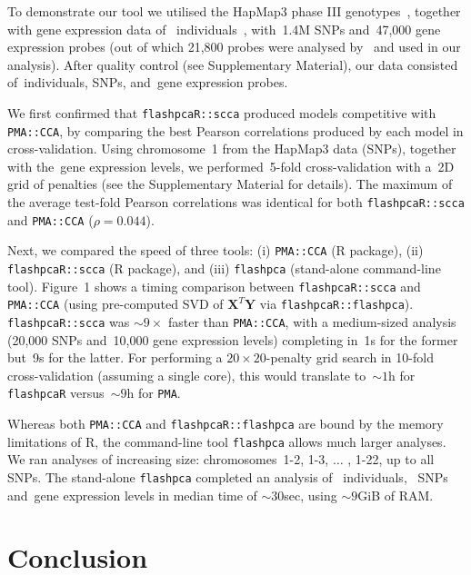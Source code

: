 \documentclass{bioinfo}
\begin{document}
To demonstrate our tool we utilised the HapMap3 phase III
genotypes~\citep{hapmap2010}, together with gene expression data of~\nindiv
individuals~\citep{Stranger2012}, with~1.4M SNPs and~47,000 gene expression
probes (out of which 21,800 probes were analysed by~\citet{Stranger2012} and
used in our analysis). After quality control (see Supplementary Material),
our data consisted of~\nindiv individuals, \nsnps SNPs, and~\ngenes gene
expression probes.

We first confirmed that \texttt{flashpcaR::scca} produced models competitive
with \texttt{PMA::CCA}, by comparing the best Pearson correlations produced
by each model in cross-validation.  Using chromosome~1 from the HapMap3
data (\nsnpschr SNPs), together with the~\ngenes gene expression levels,
we performed~5-fold cross-validation with a~2D grid of penalties (see the
Supplementary Material for details). The maximum of the average test-fold
Pearson correlations was identical for both \texttt{flashpcaR::scca} and
\texttt{PMA::CCA} ($\rho=0.044$).

Next, we compared the speed of three tools: (i) \texttt{PMA::CCA} (\textsf{R}
package), (ii) \texttt{flashpcaR::scca} (\textsf{R} package), and (iii)
\texttt{flashpca} (stand-alone command-line tool).
Figure~1\vphantom{\ref{fig:01}} shows a timing comparison between
\texttt{flashpcaR::scca} and \texttt{PMA::CCA} (using pre-computed SVD of
$\mathbf{X}^T \mathbf{Y}$ via \texttt{flashpcaR::flashpca}).
\texttt{flashpcaR::scca} was ${\sim}9\times$ faster than \texttt{PMA::CCA}, with
a medium-sized analysis (20,000 SNPs and~10,000 gene expression levels)
completing in~1s for the former but~9s for the latter.  For performing a
$20\times20$-penalty grid search in 10-fold cross-validation (assuming a single
core), this would translate to~${\sim}1$h for \texttt{flashpcaR}
versus~${\sim}9$h for \texttt{PMA}.

Whereas both \texttt{PMA::CCA} and \texttt{flashpcaR::flashpca}
are bound by the memory limitations of \textsf{R}, the command-line
tool \texttt{flashpca} allows much larger analyses. We ran analyses of
increasing size: chromosomes~1-2, 1-3, $\hdots$ , 1-22, up to all~\nsnps
SNPs. The stand-alone \texttt{flashpca} completed an analysis of~\nindiv
individuals, ~\nsnps SNPs and~\ngenes gene expression levels in median time
of ${\sim}30$sec, using ${\sim}9$GiB of RAM.

\vspace*{-12pt}
\section{Conclusion}
\end{document}
